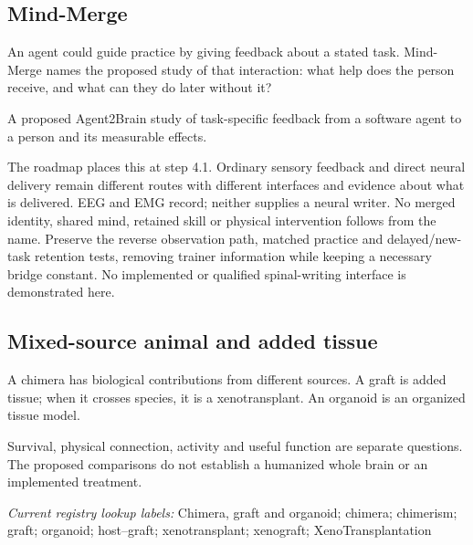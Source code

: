 \subsection*{Mind-Merge}
\noindent An agent could guide practice by giving feedback about a stated task. Mind-Merge names the proposed study of that interaction: what help does the person receive, and what can they do later without it?\par
\noindent A proposed Agent2Brain study of task-specific feedback from a software agent to a person and its measurable effects.\par
\noindent The roadmap places this at step 4.1. Ordinary sensory feedback and direct neural delivery remain different routes with different interfaces and evidence about what is delivered. EEG and EMG record; neither supplies a neural writer. No merged identity, shared mind, retained skill or physical intervention follows from the name. Preserve the reverse observation path, matched practice and delayed/new-task retention tests, removing trainer information while keeping a necessary bridge constant. No implemented or qualified spinal-writing interface is demonstrated here.\par

\begin{samepage}
\subsection*{Mixed-source animal and added tissue}
\noindent A chimera has biological contributions from different sources. A graft is added tissue; when it crosses species, it is a xenotransplant. An organoid is an organized tissue model.\par
\end{samepage}
\begin{samepage}
\noindent Survival, physical connection, activity and useful function are separate questions. The proposed comparisons do not establish a humanized whole brain or an implemented treatment.\par\nopagebreak[4]

\end{samepage}


\noindent\textit{Current registry lookup labels:} Chimera, graft and organoid; chimera; chimerism; graft; organoid; host–graft; xenotransplant; xenograft; XenoTransplantation\par

